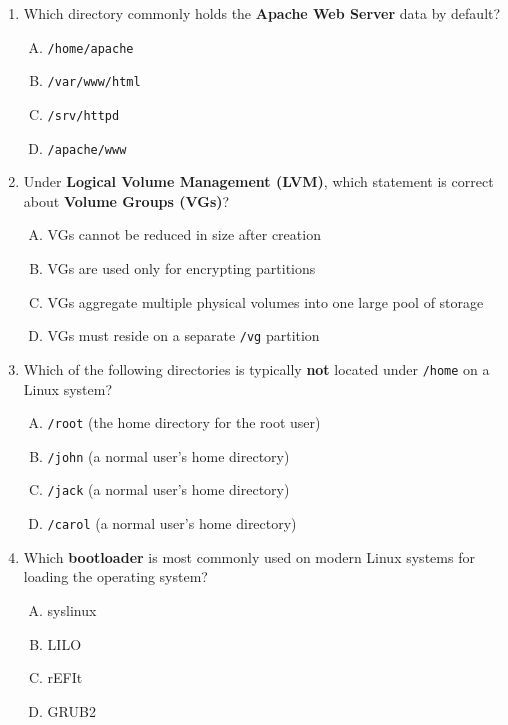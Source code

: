 \documentclass[a4paper]{report}
\begin{document}
\begin{enumerate}[1.]
    \item Which directory commonly holds the \textbf{Apache Web Server} data by default?  
    \begin{enumerate}[A)]
        \item \texttt{/home/apache}  
        \item \texttt{/var/www/html}  
        \item \texttt{/srv/httpd}  
        \item \texttt{/apache/www}  
    \end{enumerate}

    \item Under \textbf{Logical Volume Management (LVM)}, which statement is correct about \textbf{Volume Groups (VGs)}?  
    \begin{enumerate}[A)]
        \item VGs cannot be reduced in size after creation  
        \item VGs are used only for encrypting partitions  
        \item VGs aggregate multiple physical volumes into one large pool of storage  
        \item VGs must reside on a separate \texttt{/vg} partition  
    \end{enumerate}

    \item Which of the following directories is typically \textbf{not} located under \texttt{/home} on a Linux system?  
    \begin{enumerate}[A)]
        \item \texttt{/root} (the home directory for the root user)  
        \item \texttt{/john} (a normal user’s home directory)  
        \item \texttt{/jack} (a normal user’s home directory)  
        \item \texttt{/carol} (a normal user’s home directory)  
    \end{enumerate}

    \item Which \textbf{bootloader} is most commonly used on modern Linux systems for loading the operating system?  
    \begin{enumerate}[A)]
        \item syslinux  
        \item LILO  
        \item rEFIt  
        \item GRUB2  
    \end{enumerate}


\end{enumerate}
\end{document}
